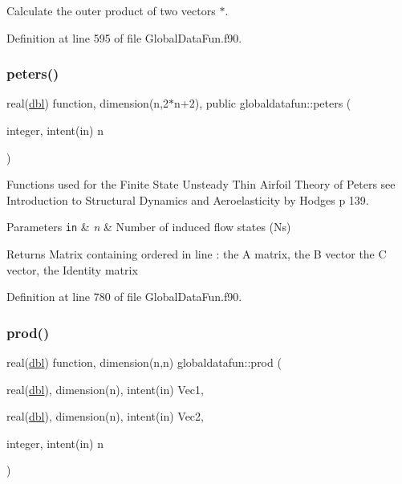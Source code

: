 Calculate the outer product of two vectors $\ast$. 



Definition at line 595 of file Global\+Data\+Fun.\+f90.

\mbox{\label{namespaceglobaldatafun_a9bdeebcd65cb298adc440430560beddc}} 
\subsubsection{\texorpdfstring{peters()}{peters()}}
{\footnotesize\ttfamily real(\hyperlink{namespaceglobaldatafun_a5008801201dd34f2af8eae07756befb4}{dbl}) function, dimension(n,2$\ast$n+2), public globaldatafun\+::peters (\begin{DoxyParamCaption}\item[{integer, intent(in)}]{n }\end{DoxyParamCaption})}



Functions used for the Finite State Unsteady Thin Airfoil Theory of Peters see Introduction to Structural Dynamics and Aeroelasticity by Hodges p 139. 


\begin{DoxyParams}[1]{Parameters}
\mbox{\tt in}  & {\em n} & Number of induced flow states (Ns)\\
\hline
\end{DoxyParams}
\begin{DoxyReturn}{Returns}
Matrix containing ordered in line \+: the A matrix, the B vector the C vector, the Identity matrix 
\end{DoxyReturn}


Definition at line 780 of file Global\+Data\+Fun.\+f90.

\mbox{\label{namespaceglobaldatafun_afe68f9e5d61e5e7844a0a4b225bb3825}} 
\subsubsection{\texorpdfstring{prod()}{prod()}}
{\footnotesize\ttfamily real(\hyperlink{namespaceglobaldatafun_a5008801201dd34f2af8eae07756befb4}{dbl}) function, dimension(n,n) globaldatafun\+::prod (\begin{DoxyParamCaption}\item[{real(\hyperlink{namespaceglobaldatafun_a5008801201dd34f2af8eae07756befb4}{dbl}), dimension(n), intent(in)}]{Vec1,  }\item[{real(\hyperlink{namespaceglobaldatafun_a5008801201dd34f2af8eae07756befb4}{dbl}), dimension(n), intent(in)}]{Vec2,  }\item[{integer, intent(in)}]{n }\end{DoxyParamCaption})\hspace{0.3cm}{\ttfamily [private]}}



